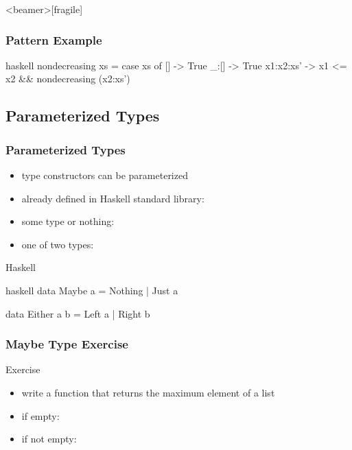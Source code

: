 \documentclass[dvipsnames]{beamer}
\theoremstyle{plain}
\begin{document}
\begin{frame}<beamer>[fragile]
  \frametitle{Pattern Example}

  \begin{example}
    \begin{pygments}{haskell}
nondecreasing xs =
    case xs of
      [] -> True
      _:[] -> True
      x1:x2:xs' -> x1 <= x2 && nondecreasing (x2:xs')
    \end{pygments}
  \end{example}
\end{frame}

\subsection{Parameterized Types}

\begin{frame}[fragile]
  \frametitle{Parameterized Types}

  \begin{itemize}
    \item type constructors can be parameterized

    \pause
    \bigskip
    \item already defined in Haskell standard library:
    \item some type or nothing: 
    \item one of two types: 
  \end{itemize}

  \begin{block}{Haskell}
    \begin{pygments}{haskell}
data Maybe a = Nothing | Just a

data Either a b = Left a | Right b
    \end{pygments}
  \end{block}
\end{frame}

\begin{frame}
  \frametitle{Maybe Type Exercise}

  \begin{block}{Exercise}
    \begin{itemize}
      \item write a function that returns the maximum element of a list
      \item if empty: 
      \item if not empty: 
    \end{itemize}
  \end{block}
\end{frame}
\end{document}
